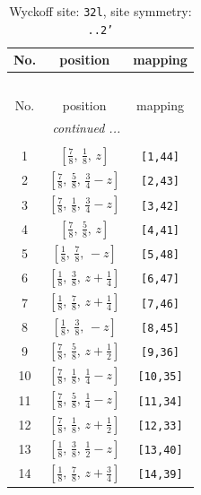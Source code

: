\documentclass[fleqn,8pt]{jsarticle}
\begin{document}
\begin{longtable}{ccc}
\caption{Wyckoff site: {\tt 32l}, site symmetry: {\tt ..2'}}
 \\
 \hline \hline
No. & position & mapping \\ \hline \endfirsthead

\multicolumn{2}{l}{\tablename\ \thetable{}} \\
 \hline \hline
No. & position & mapping \\ \hline \endhead

 \hline \hline
\multicolumn{2}{r}{\footnotesize\it continued ...} \\ \endfoot

 \hline \hline
\multicolumn{2}{r}{} \\ \endlastfoot

1 & $\left[ \frac{7}{8},\, \frac{1}{8},\, z \right]$ & {\tt [1,44]} \\ \hline
2 & $\left[ \frac{7}{8},\, \frac{5}{8},\, \frac{3}{4} - z \right]$ & {\tt [2,43]} \\ \hline
3 & $\left[ \frac{7}{8},\, \frac{1}{8},\, \frac{3}{4} - z \right]$ & {\tt [3,42]} \\ \hline
4 & $\left[ \frac{7}{8},\, \frac{5}{8},\, z \right]$ & {\tt [4,41]} \\ \hline
5 & $\left[ \frac{1}{8},\, \frac{7}{8},\, - z \right]$ & {\tt [5,48]} \\ \hline
6 & $\left[ \frac{1}{8},\, \frac{3}{8},\, z + \frac{1}{4} \right]$ & {\tt [6,47]} \\ \hline
7 & $\left[ \frac{1}{8},\, \frac{7}{8},\, z + \frac{1}{4} \right]$ & {\tt [7,46]} \\ \hline
8 & $\left[ \frac{1}{8},\, \frac{3}{8},\, - z \right]$ & {\tt [8,45]} \\ \hline
9 & $\left[ \frac{7}{8},\, \frac{5}{8},\, z + \frac{1}{2} \right]$ & {\tt [9,36]} \\ \hline
10 & $\left[ \frac{7}{8},\, \frac{1}{8},\, \frac{1}{4} - z \right]$ & {\tt [10,35]} \\ \hline
11 & $\left[ \frac{7}{8},\, \frac{5}{8},\, \frac{1}{4} - z \right]$ & {\tt [11,34]} \\ \hline
12 & $\left[ \frac{7}{8},\, \frac{1}{8},\, z + \frac{1}{2} \right]$ & {\tt [12,33]} \\ \hline
13 & $\left[ \frac{1}{8},\, \frac{3}{8},\, \frac{1}{2} - z \right]$ & {\tt [13,40]} \\ \hline
14 & $\left[ \frac{1}{8},\, \frac{7}{8},\, z + \frac{3}{4} \right]$ & {\tt [14,39]} \\ \hline

\end{longtable}
\end{document}
